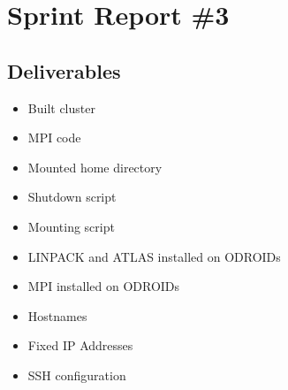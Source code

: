 \section{Sprint Report \#3}

\subsection*{Deliverables}
\begin{itemize}
	\item Built cluster
	\item MPI code
	\item Mounted home directory
	\item Shutdown script
	\item Mounting script
	\item LINPACK and ATLAS installed on ODROIDs
	\item MPI installed on ODROIDs
	\item Hostnames
	\item Fixed IP Addresses
	\item SSH configuration
\end{itemize}

